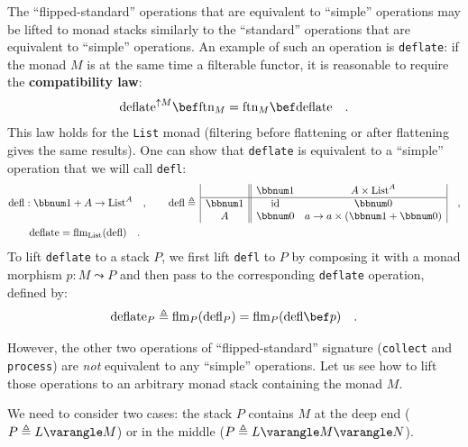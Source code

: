 The \textsf{``}flipped-standard\textsf{''} operations that are equivalent to \textsf{``}simple\textsf{''}
operations may be lifted to monad stacks similarly to the \textsf{``}standard\textsf{''}
operations that are equivalent to \textsf{``}simple\textsf{''} operations. An example
of such an operation is \lstinline!deflate!: if the monad $M$ is
at the same time a filterable functor, it is reasonable to require
the \textbf{compatibility
law}:
\begin{equation}
\text{deflate}^{\uparrow M}\bef\text{ftn}_{M}=\text{ftn}_{M}\bef\text{deflate}\quad.\label{eq:compatibility-law-deflate-flatten}
\end{equation}
This law holds for the \lstinline!List! monad (filtering before flattening
or after flattening gives the same results). One can show that \lstinline!deflate!
is equivalent to a \textsf{``}simple\textsf{''} operation that we will call \lstinline!defl!:
\begin{align*}
 & \text{defl}:\bbnum 1+A\rightarrow\text{List}^{A}\quad,\quad\quad\text{defl}\triangleq\,\begin{array}{|c||cc|}
 & \bbnum 1 & A\times\text{List}^{A}\\
\hline \bbnum 1 & \text{id} & \bbnum 0\\
A & \bbnum 0 & a\rightarrow a\times(\bbnum 1+\bbnum 0)
\end{array}\quad,\\
 & \quad\quad\text{deflate}=\text{flm}_{\text{List}}(\text{defl})\quad.
\end{align*}
To lift \lstinline!deflate! to a stack $P$, we first lift \lstinline!defl!
to $P$ by composing it with a monad morphism $p:M\leadsto P$ and
then pass to the corresponding \lstinline!deflate! operation, defined
by:
\[
\text{deflate}_{P}\triangleq\text{flm}_{P}(\text{defl}_{P})=\text{flm}_{P}(\text{defl}\bef p)\quad.
\]

However, the other two operations of \textsf{``}flipped-standard\textsf{''} signature
(\lstinline!collect! and \lstinline!process!) are \emph{not} equivalent
to any \textsf{``}simple\textsf{''} operations. Let us see how to lift those operations
to an arbitrary monad stack containing the monad $M$.

We need to consider two cases: the stack $P$ contains $M$ at the
deep end ($P\triangleq L\varangle M$) or in the middle ($P\triangleq L\varangle M\varangle N$). 


